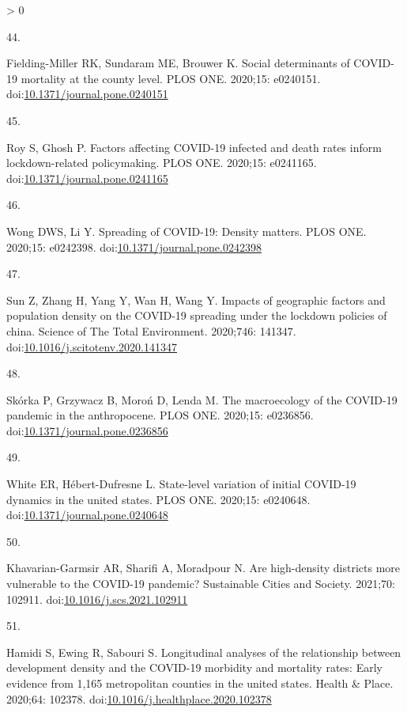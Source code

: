 \documentclass[10pt,letterpaper]{article}
\newlength{\csllabelwidth}
\newlength{\cslhangindent}
\newenvironment{CSLReferences}[3] %
 {%
  \setlength{\parindent}{0pt}
  \ifodd #1 \everypar{\setlength{\hangindent}{\cslhangindent}}\ignorespaces\fi
  \ifnum #2 > 0
  \setlength{\parskip}{#2\baselineskip}
  \fi
 }%
 {}
\newcommand{\CSLLeftMargin}[1]{\parbox[t]{\csllabelwidth}{#1}}
\newcommand{\CSLRightInline}[1]{\parbox[t]{\linewidth - \csllabelwidth}{#1}}
\begin{document}
\begin{CSLReferences}{0}{0}
\leavevmode\hypertarget{ref-Fielding2020social}{}%
\CSLLeftMargin{44. }
\CSLRightInline{Fielding-Miller RK, Sundaram ME, Brouwer K. Social
determinants of COVID-19 mortality at the county level. PLOS ONE.
2020;15: e0240151.
doi:\href{https://doi.org/10.1371/journal.pone.0240151}{10.1371/journal.pone.0240151}}

\leavevmode\hypertarget{ref-Roy2020factors}{}%
\CSLLeftMargin{45. }
\CSLRightInline{Roy S, Ghosh P. Factors affecting COVID-19 infected and
death rates inform lockdown-related policymaking. PLOS ONE. 2020;15:
e0241165.
doi:\href{https://doi.org/10.1371/journal.pone.0241165}{10.1371/journal.pone.0241165}}

\leavevmode\hypertarget{ref-Wong2020spreading}{}%
\CSLLeftMargin{46. }
\CSLRightInline{Wong DWS, Li Y. Spreading of COVID-19: Density matters.
PLOS ONE. 2020;15: e0242398.
doi:\href{https://doi.org/10.1371/journal.pone.0242398}{10.1371/journal.pone.0242398}}

\leavevmode\hypertarget{ref-Sun2020impacts}{}%
\CSLLeftMargin{47. }
\CSLRightInline{Sun Z, Zhang H, Yang Y, Wan H, Wang Y. Impacts of
geographic factors and population density on the COVID-19 spreading
under the lockdown policies of china. Science of The Total Environment.
2020;746: 141347.
doi:\href{https://doi.org/10.1016/j.scitotenv.2020.141347}{10.1016/j.scitotenv.2020.141347}}

\leavevmode\hypertarget{ref-Skorka2020macroecology}{}%
\CSLLeftMargin{48. }
\CSLRightInline{Skórka P, Grzywacz B, Moroń D, Lenda M. The macroecology
of the COVID-19 pandemic in the anthropocene. PLOS ONE. 2020;15:
e0236856.
doi:\href{https://doi.org/10.1371/journal.pone.0236856}{10.1371/journal.pone.0236856}}

\leavevmode\hypertarget{ref-White2020state}{}%
\CSLLeftMargin{49. }
\CSLRightInline{White ER, Hébert-Dufresne L. State-level variation of
initial COVID-19 dynamics in the united states. PLOS ONE. 2020;15:
e0240648.
doi:\href{https://doi.org/10.1371/journal.pone.0240648}{10.1371/journal.pone.0240648}}

\leavevmode\hypertarget{ref-Khavarian2021high}{}%
\CSLLeftMargin{50. }
\CSLRightInline{Khavarian-Garmsir AR, Sharifi A, Moradpour N. Are
high-density districts more vulnerable to the COVID-19 pandemic?
Sustainable Cities and Society. 2021;70: 102911.
doi:\href{https://doi.org/10.1016/j.scs.2021.102911}{10.1016/j.scs.2021.102911}}

\leavevmode\hypertarget{ref-Hamidi2020longitudinal}{}%
\CSLLeftMargin{51. }
\CSLRightInline{Hamidi S, Ewing R, Sabouri S. Longitudinal analyses of
the relationship between development density and the COVID-19 morbidity
and mortality rates: Early evidence from 1,165 metropolitan counties in
the united states. Health \& Place. 2020;64: 102378.
doi:\href{https://doi.org/10.1016/j.healthplace.2020.102378}{10.1016/j.healthplace.2020.102378}}


\end{CSLReferences}
\end{document}
